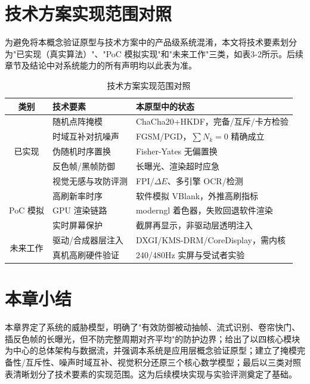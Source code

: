 \section{技术方案实现范围对照}

为避免将本概念验证原型与技术方案中的产品级系统混淆，本文将技术要素划分为"已实现（真实算法）"、"PoC 模拟实现"和"未来工作"三类，如表3-2所示。后续章节及结论中对系统能力的所有声明均以此表为准。

\begin{table}[htbp]
  \centering
  \caption{技术方案实现范围对照}
  \begin{tabular}{cll}
    \toprule
    类别 & 技术要素 & 本原型中的状态 \\
    \midrule
    \multirow{5}{*}{已实现}
      & 随机点阵掩模 & ChaCha20+HKDF，完备/互斥/卡方检验 \\
      & 时域互补对抗噪声 & FGSM/PGD，$\sum N_k=0$ 精确成立 \\
      & 伪随机时序置换 & Fisher-Yates 无偏置换 \\
      & 反色帧/黑帧防御 & 长曝光、渲染超时应急 \\
      & 视觉无感与攻防评测 & FPI/$\Delta E$、多引擎 OCR/检测 \\
    \midrule
    \multirow{3}{*}{PoC 模拟}
      & 高刷新率时序 & 软件模拟 VBlank，外推高刷指标 \\
      & GPU 渲染链路 & moderngl 着色器，失败回退软件渲染 \\
      & 实时屏幕保护 & 截屏再显示，非驱动层透明注入 \\
    \midrule
    \multirow{2}{*}{未来工作}
      & 驱动/合成器层注入 & DXGI/KMS-DRM/CoreDisplay，需内核 \\
      & 真机高刷硬件验证 & 240/480Hz 实屏与受试者实验 \\
    \bottomrule
  \end{tabular}
\end{table}

\section{本章小结}

本章界定了系统的威胁模型，明确了"有效防御被动抽帧、流式识别、卷帘快门、插反色帧的长曝光，但不防完整周期对齐平均"的防护边界；给出了以四核心模块为中心的总体架构与数据流，并强调本系统是应用层概念验证原型；建立了掩模完备性/互斥性、噪声时域互补、视觉积分还原三个核心数学模型；最后以三类对照表清晰划分了技术要素的实现范围。这为后续模块实现与实验评测奠定了基础。

